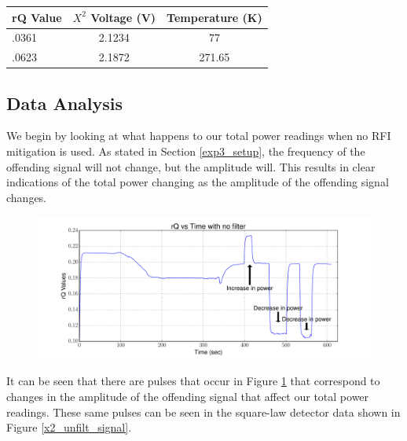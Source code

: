 \begin{table}[h!tb] \centering
{}
\label{exp3_datapoints}
\begin{tabular}{lcc} \hline
\textbf{rQ Value} & \textbf{$X^2$ Voltage (V)} & \textbf{Temperature (K)} \\ \hline
.0361 & 2.1234 & 77 \\
.0623 & 2.1872 & 271.65 \\ \hline
\end{tabular}
\end{table}

\subsection{Data Analysis}

We begin by looking at what happens to our total power readings when no RFI mitigation is used.  As stated in Section \ref{exp3_setup}, the frequency of the offending signal will not change, but the amplitude will.  This results in clear indications of the total power changing as the amplitude of the offending signal changes.  

\begin{figure}[h!tb] \centering
\includegraphics[width=\textwidth]{Experiments/Exp4/sdr_raw_unfiltered.pdf}
\label{sdr_unfilt_raw}
\end{figure}

It can be seen that there are pulses that occur in Figure \ref{sdr_unfilt_raw} that correspond to changes in the amplitude of the offending signal that affect our total power readings.  These same pulses can be seen in the square-law detector data shown in Figure \ref{x2_unfilt_signal}.

